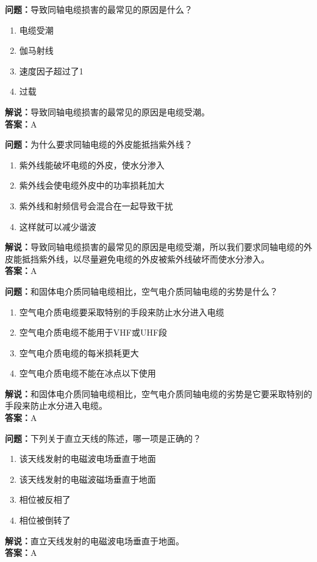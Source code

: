 \documentclass[UTF8]{ctexbook}
\begin{document}
\textbf{问题：}导致同轴电缆损害的最常见的原因是什么？
\begin{enumerate}[label=\Alph*), leftmargin=3em]
  \item 电缆受潮
  \item 伽马射线
  \item 速度因子超过了1
  \item 过载
\end{enumerate}
\textbf{解说：}导致同轴电缆损害的最常见的原因是电缆受潮。\\
\textbf{答案：}A

\textbf{问题：}为什么要求同轴电缆的外皮能抵挡紫外线？
\begin{enumerate}[label=\Alph*), leftmargin=3em]
  \item 紫外线能破坏电缆的外皮，使水分渗入
  \item 紫外线会使电缆外皮中的功率损耗加大
  \item 紫外线和射频信号会混合在一起导致干扰
  \item 这样就可以减少谐波
\end{enumerate}
\textbf{解说：}导致同轴电缆损害的最常见的原因是电缆受潮，所以我们要求同轴电缆的外皮能抵挡紫外线，以尽量避免电缆的外皮被紫外线破坏而使水分渗入。\\
\textbf{答案：}A

\textbf{问题：}和固体电介质同轴电缆相比，空气电介质同轴电缆的劣势是什么？
\begin{enumerate}[label=\Alph*), leftmargin=3em]
  \item 空气电介质电缆要采取特别的手段来防止水分进入电缆
  \item 空气电介质电缆不能用于VHF或UHF段
  \item 空气电介质电缆的每米损耗更大
  \item 空气电介质电缆不能在冰点以下使用
\end{enumerate}
\textbf{解说：}和固体电介质同轴电缆相比，空气电介质同轴电缆的劣势是它要采取特别的手段来防止水分进入电缆。\\
\textbf{答案：}A

\textbf{问题：}下列关于直立天线的陈述，哪一项是正确的？
\begin{enumerate}[label=\Alph*), leftmargin=3em]
  \item 该天线发射的电磁波电场垂直于地面
  \item 该天线发射的电磁波磁场垂直于地面
  \item 相位被反相了
  \item 相位被倒转了
\end{enumerate}
\textbf{解说：}直立天线发射的电磁波电场垂直于地面。\\
\textbf{答案：}A
\end{document}

